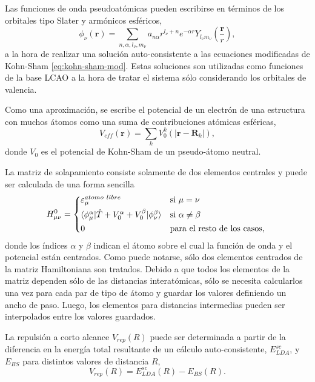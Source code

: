 \begin{enumerate}
        Las funciones de onda pseudoatómicas pueden escribirse en términos de los
        orbitales tipo Slater y armónicos esféricos,
        $$
        \phi_{\nu}(\mathbf{r}) = \sum_{n,\alpha,l_{\nu},m_{\nu}} a_{n\alpha} r^{l_{\nu}+n} e^{-\alpha r} Y_{l_{\nu}m_{\nu}}\left(\frac{\mathbf{r}}{r}\right),
        $$
        a la hora de realizar una solución auto-consistente a las ecuaciones
        modificadas de Kohn-Sham \ref{eq:kohn-sham-mod}. Estas soluciones son
        utilizadas como funciones de la base LCAO a la hora de tratar el sistema
        sólo considerando los orbitales de valencia.
        
        Como una aproximación, se escribe el potencial de un electrón de una 
        estructura con muchos átomos como una suma de contribuciones atómicas
        esféricas,
        $$
        V_{eff}(\mathbf{r}) = \sum_k V_0^k(|\mathbf{r} - \mathbf{R}_k|),
        $$
        donde $V_0$ es el potencial de Kohn-Sham de un pseudo-átomo neutral.

        La matriz de solapamiento consiste solamente de dos elementos centrales
        y puede ser calculada de una forma sencilla
        \begin{equation*}
            H_{\mu\nu}^0 = 
            \begin{cases*}
                \varepsilon_{\mu}^{atomo\ libre} & si $\mu = \nu$ \\
                \langle \phi_{\mu}^{\alpha} | \hat{T} + V_0^{\alpha} + V_0^{\beta} | \phi_{\nu}^{\beta} \rangle & si $\alpha \neq \beta$ \\
                0 & para el resto de los casos,
            \end{cases*}
        \end{equation*}
        donde los índices $\alpha$ y $\beta$ indican el átomo sobre el cual la
        función de onda y el potencial están centrados. Como puede notarse, sólo
        dos elementos centrados de la matriz Hamiltoniana son tratados. Debido a
        que todos los elementos de la matriz dependen sólo de las distancias 
        interatómicas, sólo se necesita calcularlos una vez para cada par de tipo
        de átomo y guardar los valores definiendo un ancho de paso. Luego, los 
        elementos para distancias intermedias pueden ser interpolados entre los
        valores guardados.

        La repulsión a corto alcance $V_{rep}(R)$ puede ser determinada a partir
        de la diferencia en la energía total resultante de un cálculo 
        auto-consistente, $E_{LDA}^{sc}$, y $E_{BS}$ para distintos valores de 
        distancia $R$,
        $$
        V_{rep}(R) = E_{LDA}^{sc}(R) - E_{BS}(R).
        $$


\end{enumerate}
